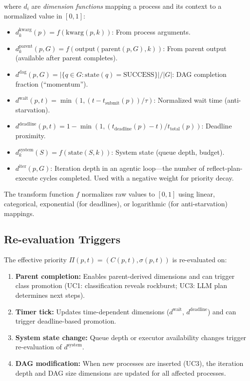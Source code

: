 \documentclass[conference]{IEEEtran}
\begin{document}
where $d_i$ are \emph{dimension functions} mapping a process and its context to a normalized value in $[0, 1]$:

\begin{itemize}
    \item $d^{\text{kwarg}}_{k}(p) = f(\text{kwarg}(p, k))$: From process arguments.
    \item $d^{\text{parent}}_{k}(p, G) = f(\text{output}(\text{parent}(p, G), k))$: From parent output (available after parent completes).
    \item $d^{\text{dag}}(p, G) = |\{q \in G : \text{state}(q) = \text{SUCCESS}\}| / |G|$: DAG completion fraction (``momentum'').
    \item $d^{\text{wait}}(p, t) = \min(1, (t - t_{\text{submit}}(p)) / \tau)$: Normalized wait time (anti-starvation).
    \item $d^{\text{deadline}}(p, t) = 1 - \min(1, (t_{\text{deadline}}(p) - t) / t_{\text{total}}(p))$: Deadline proximity.
    \item $d^{\text{system}}_{k}(S) = f(\text{state}(S, k))$: System state (queue depth, budget).
    \item $d^{\text{iter}}(p, G)$: Iteration depth in an agentic loop---the number of reflect-plan-execute cycles completed. Used with a negative weight for priority decay.
\end{itemize}

The transform function $f$ normalizes raw values to $[0, 1]$ using linear, categorical, exponential (for deadlines), or logarithmic (for anti-starvation) mappings.

\subsection{Re-evaluation Triggers}

The effective priority $\Pi(p, t) = (C(p, t), \sigma(p, t))$ is re-evaluated on:

\begin{enumerate}
    \item \textbf{Parent completion:} Enables parent-derived dimensions and can trigger class promotion (UC1: classification reveals rockburst; UC3: LLM plan determines next steps).
    \item \textbf{Timer tick:} Updates time-dependent dimensions ($d^{\text{wait}}$, $d^{\text{deadline}}$) and can trigger deadline-based promotion.
    \item \textbf{System state change:} Queue depth or executor availability changes trigger re-evaluation of $d^{\text{system}}$.
    \item \textbf{DAG modification:} When new processes are inserted (UC3), the iteration depth and DAG size dimensions are updated for all affected processes.
\end{enumerate}
\end{document}
